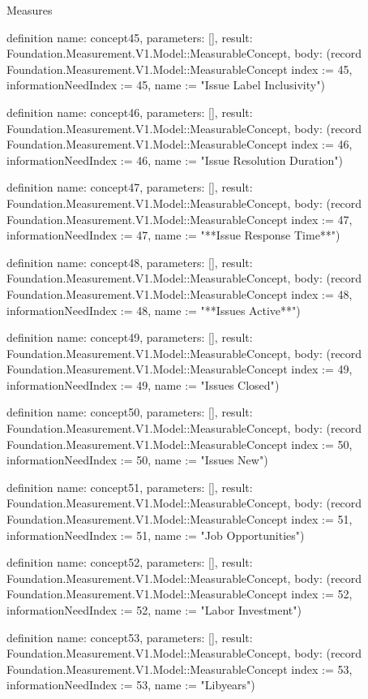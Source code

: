 \begin{lexlean}{Measures}
\begin{semanticmodule}
definition{
  name: concept45,
  parameters: [],
  result: Foundation.Measurement.V1.Model::MeasurableConcept,
  body: (record Foundation.Measurement.V1.Model::MeasurableConcept {index := 45, informationNeedIndex := 45, name := "Issue Label Inclusivity"})
}

definition{
  name: concept46,
  parameters: [],
  result: Foundation.Measurement.V1.Model::MeasurableConcept,
  body: (record Foundation.Measurement.V1.Model::MeasurableConcept {index := 46, informationNeedIndex := 46, name := "Issue Resolution Duration"})
}

definition{
  name: concept47,
  parameters: [],
  result: Foundation.Measurement.V1.Model::MeasurableConcept,
  body: (record Foundation.Measurement.V1.Model::MeasurableConcept {index := 47, informationNeedIndex := 47, name := "**Issue Response Time**"})
}

definition{
  name: concept48,
  parameters: [],
  result: Foundation.Measurement.V1.Model::MeasurableConcept,
  body: (record Foundation.Measurement.V1.Model::MeasurableConcept {index := 48, informationNeedIndex := 48, name := "**Issues Active**"})
}

definition{
  name: concept49,
  parameters: [],
  result: Foundation.Measurement.V1.Model::MeasurableConcept,
  body: (record Foundation.Measurement.V1.Model::MeasurableConcept {index := 49, informationNeedIndex := 49, name := "Issues Closed"})
}

definition{
  name: concept50,
  parameters: [],
  result: Foundation.Measurement.V1.Model::MeasurableConcept,
  body: (record Foundation.Measurement.V1.Model::MeasurableConcept {index := 50, informationNeedIndex := 50, name := "Issues New"})
}

definition{
  name: concept51,
  parameters: [],
  result: Foundation.Measurement.V1.Model::MeasurableConcept,
  body: (record Foundation.Measurement.V1.Model::MeasurableConcept {index := 51, informationNeedIndex := 51, name := "Job Opportunities"})
}

definition{
  name: concept52,
  parameters: [],
  result: Foundation.Measurement.V1.Model::MeasurableConcept,
  body: (record Foundation.Measurement.V1.Model::MeasurableConcept {index := 52, informationNeedIndex := 52, name := "Labor Investment"})
}

definition{
  name: concept53,
  parameters: [],
  result: Foundation.Measurement.V1.Model::MeasurableConcept,
  body: (record Foundation.Measurement.V1.Model::MeasurableConcept {index := 53, informationNeedIndex := 53, name := "Libyears"})
}


\end{semanticmodule}
\end{lexlean}
